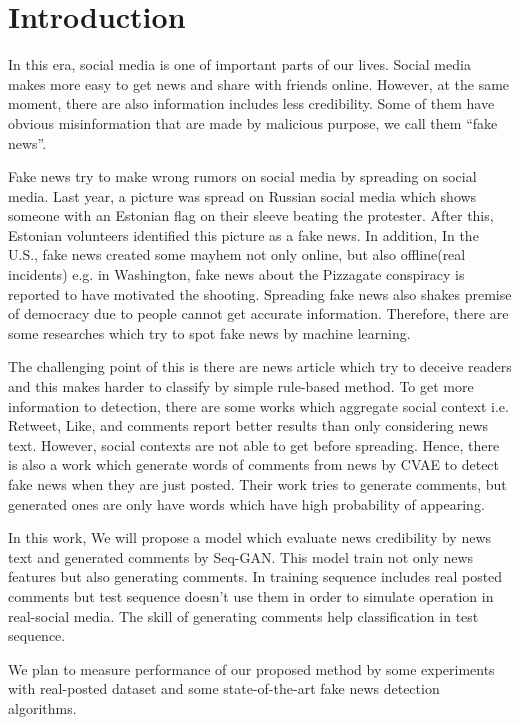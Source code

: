 \section{Introduction}
In this era, social media is one of important parts of our lives.
Social media makes more easy to get news and share with friends online.
However, at the same moment, 
there are also information includes less credibility.
Some of them have obvious misinformation that are made by malicious purpose,
we call them ``fake news''.

Fake news try to make wrong rumors on social media by spreading on social media.
Last year, a picture was spread on Russian social media which shows someone with an Estonian flag on their sleeve beating the protester.
After this, Estonian volunteers identified this picture as a fake news\cite{vaikmaa_2019}.
In addition, In the U.S., fake news created some mayhem not only online, but also offline(real incidents)
e.g. in Washington, fake news about the Pizzagate conspiracy is reported to have motivated the shooting\cite{agencies_2016}.
Spreading fake news also shakes premise of democracy due to people cannot get accurate information.
Therefore, there are some researches which try to spot fake news by machine learning.

The challenging point of this is there are news article which try to deceive readers
and this makes harder to classify by simple rule-based method.
To get more information to detection,
there are some works which aggregate social context i.e. Retweet, Like, and comments
report better results than only considering news text\cite{Guo:2018:RDH:3269206.3271709}.
However, social contexts are not able to get before spreading.
Hence, there is also a work which generate words of comments from news by CVAE to detect fake news when they are just posted\cite{ijcai2018-533}.
Their work tries to generate comments, but generated ones are only have words which have high probability of appearing.

In this work, We will propose a model which evaluate news credibility by news text and generated comments by Seq-GAN\cite{Yu:2017:SSG:3298483.3298649}.
This model train not only news features but also generating comments.
In training sequence includes real posted comments but test sequence doesn't use them in order to simulate operation in real-social media.
The skill of generating comments help classification in test sequence.

We plan to measure performance of our proposed method by some experiments with real-posted dataset and some state-of-the-art fake news detection algorithms.
